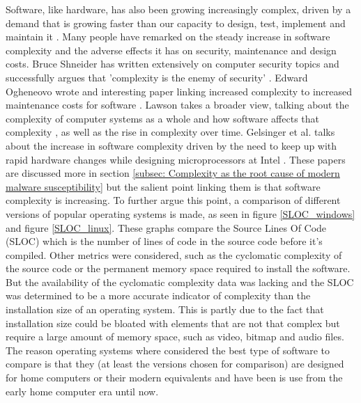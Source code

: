 Software, like hardware, has also been growing increasingly complex, driven by a demand that is growing faster than our capacity to design, test, implement and maintain it
\cite{RN85}. Many people have remarked on the steady increase in software complexity and the adverse effects it has on security, maintenance and design costs. Bruce Shneider has written extensively on computer security topics and successfully argues that 'complexity is the enemy of security' 
\cite{RN11} \cite{RN3}. Edward Ogheneovo wrote and interesting paper linking increased complexity to increased maintenance costs for software 
\cite{RN81}. Lawson takes a broader view, talking about the complexity of computer systems as a whole and how software affects that complexity 
\cite{RN55}, as well as the rise in complexity over time. Gelsinger et al. talks about the increase in software complexity driven by the need to keep up with rapid hardware changes while designing microprocessors at Intel 
\cite{RN18}. These papers are discussed more in section \ref{subsec: Complexity as the root cause of modern malware susceptibility} but the salient point linking them is that software complexity is increasing. To further argue this point, a comparison of different versions of popular operating systems is made, as seen in figure \ref{SLOC_windows} and figure \ref{SLOC_linux}. These graphs compare the Source Lines Of Code (SLOC) which is the number of lines of code in the source code before it's compiled. Other metrics were considered, such as the cyclomatic complexity of the source code or the permanent memory space required to install the software. But the availability of the cyclomatic complexity data was lacking and the SLOC was determined to be a more accurate indicator of complexity than the installation size of an operating system. This is partly due to the fact that installation size could be bloated with elements that are not that complex but require a large amount of memory space, such as video, bitmap and audio files. The reason operating systems where considered the best type of software to compare is that they (at least the versions chosen for comparison) are designed for home computers or their modern equivalents and have been is use from the early home computer era until now. 

